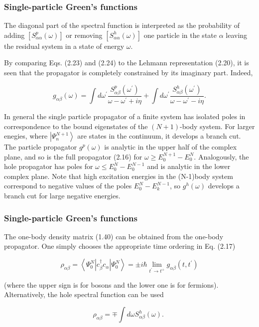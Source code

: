 \documentclass[compress]{beamer}
\begin{document}
\frame
{
\frametitle{Single-particle Green's functions}
\begin{small}
{\scriptsize
The diagonal part of the spectral function is interpreted as the
probability of adding $\left[S_{\alpha \alpha}^{p}(\omega)\right]$ or
removing $\left[S_{\alpha \alpha}^{h}(\omega)\right]$ one particle in
the state $\alpha$ leaving the residual system in a state of energy
$\omega$.

By comparing Eqs. (2.23) and (2.24) to the Lehmann representation
(2.20), it is seen that the propagator is completely constrained by
its imaginary part. Indeed,

$$
g_{\alpha \beta}(\omega)=\int d \omega^{\prime} \frac{S_{\alpha \beta}^{p}\left(\omega^{\prime}\right)}{\omega-\omega^{\prime}+i \eta}+\int d \omega^{\prime} \frac{S_{\alpha \beta}^{h}\left(\omega^{\prime}\right)}{\omega-\omega^{\prime}-i \eta} .
$$

In general the single particle propagator of a finite system has isolated poles in correspondence to the bound eigenstates of the $(N+1)$-body system. For larger enegies, where $\left|\Psi_{n}^{N+1}\right\rangle$ are states in the continuum, it develops a branch cut. The particle propagator $g^{p}(\omega)$ is analytic in the upper half of the complex plane, and so is the full propagator (2.16) for $\omega \geq E_{0}^{N+1}-E_{0}^{N}$. Analogously, the hole propagator has poles for $\omega \leq E_{0}^{N}-E_{0}^{N-1}$ and is analytic in the lower complex plane. Note that high excitation energies in the (N-1)body system correspond to negative values of the poles $E_{0}^{N}-E_{k}^{N-1}$, so $g^{h}(\omega)$ develops a branch cut for large negative energies.

}
\end{small}
}
\frame
{
\frametitle{Single-particle Green's functions}
\begin{small}
{\scriptsize
The one-body density matrix (1.40) can be obtained from the one-body
propagator. One simply chooses the appropriate time ordering in
Eq. (2.17)

$$
\rho_{\alpha \beta}=\left\langle\Psi_{0}^{N}\left|c_{\beta}^{\dagger} c_{\alpha}\right| \Psi_{0}^{N}\right\rangle= \pm i \hbar \lim _{t^{\prime} \rightarrow t^{+}} g_{\alpha \beta}\left(t, t^{\prime}\right)
$$

(where the upper sign is for bosons and the lower one is for fermions). Alternatively, the hole spectral function can be used

$$
\rho_{\alpha \beta}=\mp \int d \omega S_{\alpha \beta}^{h}(\omega) \text {. }
$$

}
\end{small}
}
\end{document}
